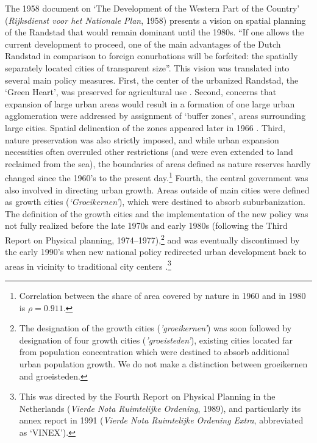 \documentclass[a4paper,authoryear,review]{elsarticle}  	%
\begin{document}
	The 1958 document on ‘The Development of the Western Part of the Country’ (\emph{Rijksdienst voor het Nationale Plan}, 1958) presents a vision on spatial planning of the Randstad that would remain dominant until the 1980s. “If one allows the current development to proceed, one of the main advantages of the Dutch Randstad in comparison to foreign conurbations will be forfeited: the spatially separately located cities of transparent size”. This vision was translated into several main policy measures. First, the center of the urbanized Randstad, the ‘Green Heart’, was preserved for agricultural use \citep{Koomen2008,Koomen2013}. Second, concerns that expansion of large urban areas would result in a formation of one large urban agglomeration were addressed by assignment of ‘buffer zones’, areas surrounding large cities. Spatial delineation of the zones appeared later in 1966 \citep{Dieleman1999a,Koomen2008}. Third, nature preservation was also strictly imposed, and while urban expansion necessities often overruled other restrictions (and were even extended to land reclaimed from the sea), the boundaries of areas defined as nature reserves hardly changed since the 1960’s to the present day.\footnote{Correlation between the share of area covered by nature in 1960 and in 1980 is $\rho=0.911$.}
	Fourth, the central government was also involved in directing urban growth. Areas outside of main cities were defined as growth cities (\emph{‘Groeikernen’}), which were destined to absorb suburbanization. The definition of the growth cities and the implementation of the new policy was not fully realized before the late 1970s and early 1980s (following the Third Report on Physical planning, 1974--1977),\footnote{The designation of the growth cities (\emph{'groeikernen'}) was soon followed by designation of four growth cities (\emph{'groeisteden'}), existing cities located far from population concentration which were destined to absorb additional urban population growth. We do not make a distinction between groeikernen and groeisteden.} and was eventually discontinued by the early 1990’s when new national policy redirected urban development back to areas in vicinity to traditional city centers \citep{Geurs2006a,Jobse1991,Ostendorf1996}.\footnote{This was directed by the Fourth Report on Physical Planning in the Netherlands (\emph{Vierde Nota Ruimtelijke Ordening}, 1989), and particularly its annex report in 1991 (\emph{Vierde Nota Ruimtelijke Ordening Extra}, abbreviated as ‘VINEX’).}	
	
\end{document}
